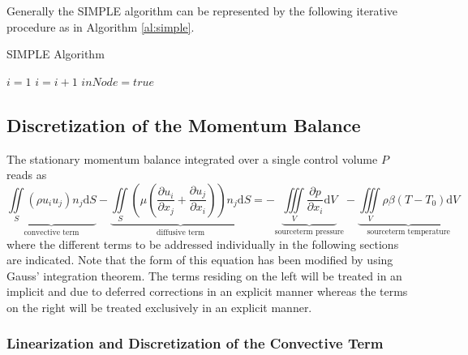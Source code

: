   Generally the SIMPLE algorithm can be represented by the following iterative procedure as in Algorithm \ref{al:simple}.
\begin{algorithm}
\label{al:simple}
\caption{SIMPLE Algorithm}
\begin{algorithmic}
\State $i=1$ \Comment{*}
                 \Comment{*}
        \State $i=i+1$
    \EndWhile
                             \Comment{*}
                                             
            \State $inNode = true$
        \EndIf
    \EndIf
\end{algorithmic}
\end{algorithm}

  \subsection{Discretization of the Momentum Balance}
  \label{sec:segdiscretization}

      The stationary momentum balance integrated over a single control volume \(P\) reads as
      \begin{equation}
        \label{eq:semidiscrete}
        \underbrace{\iint\limits_S (\rho u_i u_j)n_j \mathrm{d}S}_{\text{convective term}}
        - \underbrace{\iint\limits_S \left(\mu \left( \frac{\partial u_i}{\partial x_j} + \frac{\partial u_j}{\partial x_i}\right)\right)n_j \mathrm{d}S}_{\text{diffusive term}}
        = - \underbrace{\iiint\limits_V \frac{\partial p}{\partial x_i} \mathrm{d}V}_{\text{sourceterm pressure}}
        - \underbrace{\iiint\limits_V \rho \beta \left(T - T_0\right) \mathrm{d}V}_{\text{sourceterm temperature}}
      \end{equation}
      where the different terms to be addressed individually in the following sections are indicated. Note that the form of this equation has been modified by using Gauss' integration theorem. The terms residing on the left will be treated in an implicit and due to deferred corrections in an explicit manner whereas the terms on the right will be treated exclusively in an  explicit manner.

      \subsubsection{Linearization and Discretization of the Convective Term}

